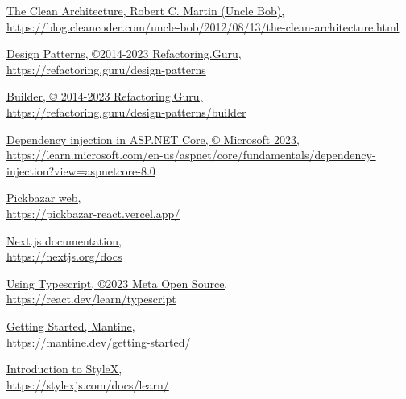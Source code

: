 \documentclass[12pt, a4paper]{report}
\theoremstyle{definition}
\begin{document}
\listoffigures
\listoftables








\begin{thebibliography}{80}
     \href{https://blog.cleancoder.com/uncle-bob/2012/08/13/the-clean-architecture.html}{\color{black}The Clean Architecture, Robert C. Martin (Uncle Bob), \\ https://blog.cleancoder.com/uncle-bob/2012/08/13/the-clean-architecture.html}

     \href{https://refactoring.guru/design-patterns}{\color{black}Design Patterns, ©2014-2023 Refactoring.Guru, \\
    https://refactoring.guru/design-patterns}
    
     \href{https://refactoring.guru/design-patterns/builder}{\color{black}Builder, © 2014-2023 Refactoring.Guru, \\
    https://refactoring.guru/design-patterns/builder}
    
     \href{https://learn.microsoft.com/en-us/aspnet/core/fundamentals/dependency-injection?view=aspnetcore-8.0}{\color{black}Dependency injection in ASP.NET Core, © Microsoft 2023, \\ https://learn.microsoft.com/en-us/aspnet/core/fundamentals/dependency-injection?view=aspnetcore-8.0}

     \href{https://pickbazar-react.vercel.app/}{\color{black}Pickbazar web, \\https://pickbazar-react.vercel.app/}

     \href{https://nextjs.org/docs}{\color{black}Next.js documentation, \\https://nextjs.org/docs}

     \href{https://react.dev/learn/typescript}{\color{black}Using Typescript, ©2023 Meta Open Source, \\https://react.dev/learn/typescript}

     \href{https://mantine.dev/getting-started/}{\color{black}Getting Started, Mantine,\\https://mantine.dev/getting-started/}

     \href{https://stylexjs.com/docs/learn/}{\color{black}Introduction to StyleX,\\https://stylexjs.com/docs/learn/}


\end{thebibliography}
\end{document}
